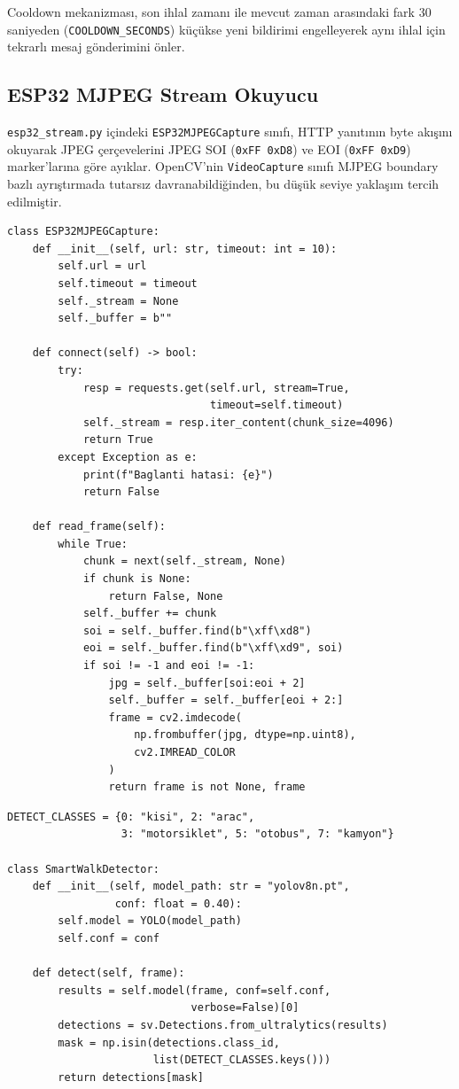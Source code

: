 Cooldown mekanizması, son ihlal zamanı ile mevcut zaman arasındaki fark 30 saniyeden (\texttt{COOLDOWN\_SECONDS}) küçükse yeni bildirimi engelleyerek aynı ihlal için tekrarlı mesaj gönderimini önler.

\subsection{ESP32 MJPEG Stream Okuyucu}

\texttt{esp32\_stream.py} içindeki \texttt{ESP32MJPEGCapture} sınıfı, HTTP yanıtının byte akışını okuyarak JPEG çerçevelerini JPEG SOI (\texttt{0xFF 0xD8}) ve EOI (\texttt{0xFF 0xD9}) marker'larına göre ayıklar. OpenCV'nin \texttt{VideoCapture} sınıfı MJPEG boundary bazlı ayrıştırmada tutarsız davranabildiğinden, bu düşük seviye yaklaşım tercih edilmiştir.

\begin{lstlisting}[caption={ESP32MJPEGCapture -- JPEG marker tabanlı çerçeve ayıklama}, label={lst:mjpeg}]
class ESP32MJPEGCapture:
    def __init__(self, url: str, timeout: int = 10):
        self.url = url
        self.timeout = timeout
        self._stream = None
        self._buffer = b""

    def connect(self) -> bool:
        try:
            resp = requests.get(self.url, stream=True,
                                timeout=self.timeout)
            self._stream = resp.iter_content(chunk_size=4096)
            return True
        except Exception as e:
            print(f"Baglanti hatasi: {e}")
            return False

    def read_frame(self):
        while True:
            chunk = next(self._stream, None)
            if chunk is None:
                return False, None
            self._buffer += chunk
            soi = self._buffer.find(b"\xff\xd8")
            eoi = self._buffer.find(b"\xff\xd9", soi)
            if soi != -1 and eoi != -1:
                jpg = self._buffer[soi:eoi + 2]
                self._buffer = self._buffer[eoi + 2:]
                frame = cv2.imdecode(
                    np.frombuffer(jpg, dtype=np.uint8),
                    cv2.IMREAD_COLOR
                )
                return frame is not None, frame
\end{lstlisting}

\begin{lstlisting}[caption={SmartWalkDetector -- YOLOv8n çıkarımı ve sınıf filtresi}, label={lst:detector}]
DETECT_CLASSES = {0: "kisi", 2: "arac",
                  3: "motorsiklet", 5: "otobus", 7: "kamyon"}

class SmartWalkDetector:
    def __init__(self, model_path: str = "yolov8n.pt",
                 conf: float = 0.40):
        self.model = YOLO(model_path)
        self.conf = conf

    def detect(self, frame):
        results = self.model(frame, conf=self.conf,
                             verbose=False)[0]
        detections = sv.Detections.from_ultralytics(results)
        mask = np.isin(detections.class_id,
                       list(DETECT_CLASSES.keys()))
        return detections[mask]
\end{lstlisting}

